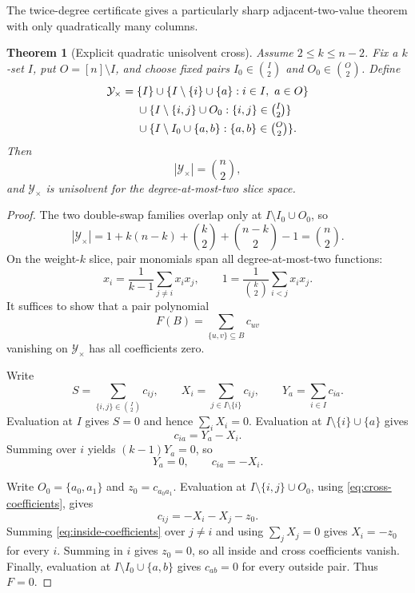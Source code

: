 \documentclass[11pt]{article}
\newtheorem{theorem}{Theorem}[section]
\theoremstyle{definition}
\theoremstyle{remark}
\newcommand{\cY}{\mathcal Y}
\newcommand{\1}{\mathbf 1}
\begin{document}
The twice-degree certificate gives a particularly sharp adjacent-two-value
theorem with only quadratically many columns.

\begin{theorem}[Explicit quadratic unisolvent cross]
\label{thm:explicit-cross}
Assume $2\le k\le n-2$.  Fix a $k$-set $I$, put $O=[n]\setminus I$, and
choose fixed pairs $I_0\in\binom I2$ and $O_0\in\binom O2$.  Define
\begin{align*}
 \cY_\times={}&\{I\}
 \cup\{I\setminus\{i\}\cup\{a\}:i\in I,\ a\in O\}\\
 &{}\cup\{I\setminus\{i,j\}\cup O_0:\{i,j\}\in\tbinom I2\}\\
 &{}\cup\{I\setminus I_0\cup\{a,b\}:\{a,b\}\in\tbinom O2\}.
\end{align*}
Then
\[
 |\cY_\times|=\binom n2,
\]
and $\cY_\times$ is unisolvent for the degree-at-most-two slice space.
\end{theorem}

\begin{proof}
The two double-swap families overlap only at $I\setminus I_0\cup O_0$, so
\[
 |\cY_\times|
 =1+k(n-k)+\binom k2+\binom{n-k}2-1
 =\binom n2.
\]
On the weight-$k$ slice, pair monomials span all degree-at-most-two functions:
\[
 x_i=\frac1{k-1}\sum_{j\ne i}x_ix_j,
 \qquad
 1=\frac1{\binom k2}\sum_{i<j}x_ix_j.
\]
It suffices to show that a pair polynomial
\[
 F(B)=\sum_{\{u,v\}\subseteq B}c_{uv}
\]
vanishing on $\cY_\times$ has all coefficients zero.

Write
\[
 S=\sum_{\{i,j\}\in\binom I2}c_{ij},
 \qquad X_i=\sum_{j\in I\setminus\{i\}}c_{ij},
 \qquad Y_a=\sum_{i\in I}c_{ia}.
\]
Evaluation at $I$ gives $S=0$ and hence $\sum_iX_i=0$.  Evaluation at
$I\setminus\{i\}\cup\{a\}$ gives
\[
 c_{ia}=Y_a-X_i.
\]
Summing over $i$ yields $(k-1)Y_a=0$, so
\begin{equation}\label{eq:cross-coefficients}
 Y_a=0,
 \qquad c_{ia}=-X_i.
\end{equation}

Write $O_0=\{a_0,a_1\}$ and $z_0=c_{a_0a_1}$.  Evaluation at
$I\setminus\{i,j\}\cup O_0$, using \eqref{eq:cross-coefficients}, gives
\begin{equation}\label{eq:inside-coefficients}
 c_{ij}=-X_i-X_j-z_0.
\end{equation}
Summing \eqref{eq:inside-coefficients} over $j\ne i$ and using
$\sum_jX_j=0$ gives $X_i=-z_0$ for every $i$.  Summing in $i$ gives
$z_0=0$, so all inside and cross coefficients vanish.  Finally, evaluation
at $I\setminus I_0\cup\{a,b\}$ gives $c_{ab}=0$ for every outside pair.
Thus $F=0$.
\end{proof}
\end{document}
